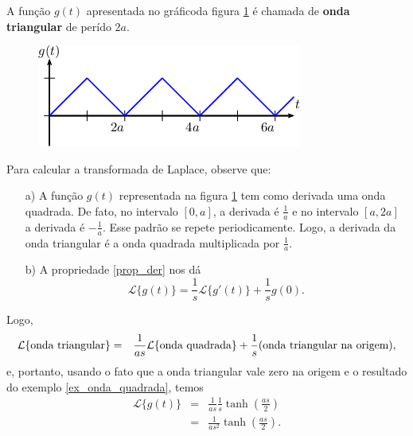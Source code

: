 \documentclass[a4paper,10pt]{book}
\begin{document}
 
A função $g(t)$ apresentada no gráficoda figura \ref{fig_onda_triangular} é chamada de {\bf onda triangular} de perído $2a$.
\begin{figure}[!ht]
 \begin{center}
 
 \includegraphics{figs/especiais_figura_2}\end{center}
 \caption{\label{fig_onda_triangular}}
 \end{figure}
 Para calcular a transformada de Laplace, observe que:
 \begin{itemize}
  \item[a)] A função $g(t)$ representada na figura \ref{fig_onda_triangular} tem como derivada uma onda quadrada. De fato, no intervalo $[0,a]$, a derivada é $\frac{1}{a}$ e no intervalo $[a,2a]$ a derivada é $-\frac{1}{a}$. Esse padrão se repete periodicamente. Logo, a derivada da onda triangular é a onda quadrada multiplicada por $\frac{1}{a}$.
  \item[b)] A propriedade \ref{prop_der} nos dá
  \begin{equation}
  \mathcal{L}\{g(t)\}=\frac{1}{s}\mathcal{L}\{g'(t)\}+\frac{1}{s}g(0).
  \end{equation}
 \end{itemize}
 Logo,
 \begin{eqnarray*}
 \mathcal{L}\{\hbox{onda triangular}\}&=&\frac{1}{as}\mathcal{L}\{\hbox{onda quadrada}\}+\frac{1}{s}\hbox{(onda triangular na origem)},
 \end{eqnarray*}
 e, portanto, usando o fato que a onda triangular vale zero na origem e o resultado do exemplo \ref{ex_onda_quadrada}, temos
 \begin{eqnarray*}
 \mathcal{L}\{g(t)\}&=&\frac{1}{as}\frac{1}{s} \tanh\left(\frac{as}{2}\right)\\
 &=&\frac{1}{as^2} \tanh\left(\frac{as}{2}\right).
 \end{eqnarray*}
\end{document}
